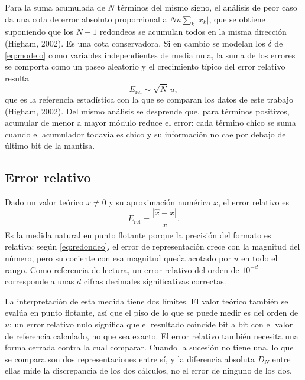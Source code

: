 Para la suma acumulada de $N$ términos del mismo signo, el análisis de peor caso da una cota de
error absoluto proporcional a $N u \sum_{k} |x_k|$, que se obtiene suponiendo que los $N-1$
redondeos se acumulan todos en la misma dirección (Higham, 2002). Es una cota conservadora. Si en
cambio se modelan los $\delta$ de \eqref{eq:modelo} como variables independientes de media nula, la
suma de los errores se comporta como un paseo aleatorio y el crecimiento típico del error relativo
resulta
\begin{equation}
  E_{\mathrm{rel}} \sim \sqrt{N}\,u ,
  \label{eq:cota-raiz}
\end{equation}
que es la referencia estadística con la que se comparan los datos de este trabajo (Higham, 2002).
Del mismo análisis se desprende que, para términos positivos, acumular de menor a mayor módulo
reduce el error: cada término chico se suma cuando el acumulador todavía es chico y su información
no cae por debajo del último bit de la mantisa.

\subsection{Error relativo}
\label{subsec:error-relativo}

Dado un valor teórico $x \ne 0$ y su aproximación numérica $\hat{x}$, el error relativo es
\begin{equation}
  E_{\mathrm{rel}} = \frac{|\hat{x} - x|}{|x|} .
  \label{eq:error-relativo}
\end{equation}
Es la medida natural en punto flotante porque la precisión del formato es relativa: según
\eqref{eq:redondeo}, el error de representación crece con la magnitud del número, pero su cociente
con esa magnitud queda acotado por $u$ en todo el rango. Como referencia de lectura, un error
relativo del orden de $10^{-d}$ corresponde a unas $d$ cifras decimales significativas correctas.

La interpretación de esta medida tiene dos límites. El valor teórico también
se evalúa en punto flotante, así que el piso de lo que se puede medir es del orden de $u$: un error
relativo nulo significa que el resultado coincide bit a bit con el valor de referencia calculado, no
que sea exacto. El error relativo también necesita una forma cerrada contra la cual
comparar. Cuando la sucesión no tiene una, lo que se compara son dos representaciones entre sí, y la
diferencia absoluta $D_N$ entre ellas mide la discrepancia de los dos cálculos, no el error de
ninguno de los dos.

